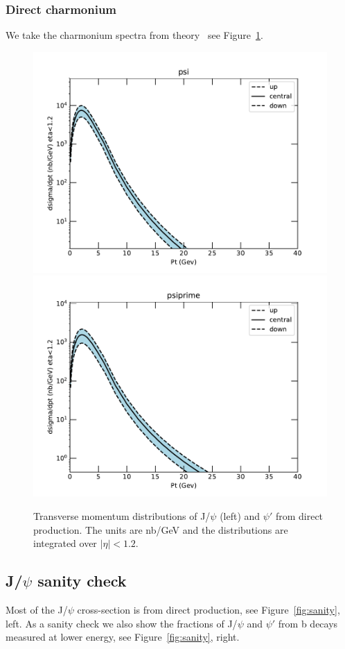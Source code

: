 \documentclass[12pt]{article}
\begin{document}
\subsubsection{Direct charmonium}
\label{sec:psidirect}
We take the charmonium spectra from theory~\cite{Ma:2010yw, Ma:2010jj, Ma:2014mri}
see Figure~\ref{fig:ma}.  

\begin{figure}
\includegraphics[width=0.48\linewidth]{../oniaDirect/CMS-13-TeV/theory/psiLowPt/psiDirect_fullRange.pdf}  
\includegraphics[width=0.48\linewidth]{../oniaDirect/CMS-13-TeV/theory/psiLowPt/psiprimeDirect_fullRange.pdf}  
  \caption{Transverse momentum distributions of J/$\psi$ (left) 
and $\psi'$ from direct production. The units are nb/GeV and the 
distributions 
are integrated over $|\eta|<1.2$.}
  \label{fig:ma}
\end{figure}


\subsection{J/$\psi$ sanity check}
\label{sec:psiSanity}

Most of the J/$\psi$ cross-section is from direct production, see
Figure~\ref{fig:sanity}, left.  As a sanity check we also show
the fractions of J/$\psi$ and $\psi'$ from b decays measured
at lower energy, see 
Figure~\ref{fig:sanity}, right\cite{Khachatryan:2010yr}.
\end{document}
